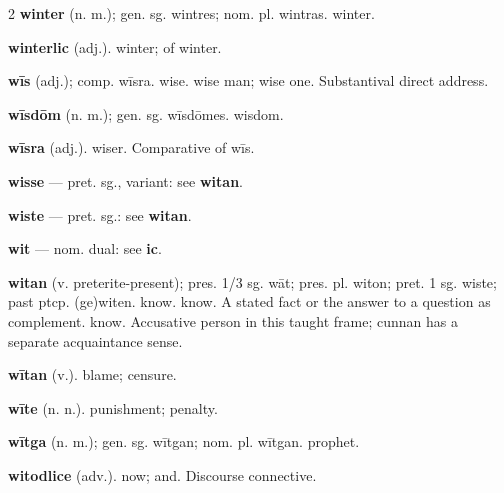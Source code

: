 \begin{multicols*}{2}
\textbf{winter} (n. m.); gen. sg. wintres; nom. pl. wintras. winter.\par
\textbf{winterlic} (adj.). winter; of winter.\par
\textbf{wīs} (adj.); comp. wīsra. wise. wise man; wise one. Substantival direct address.\par
\textbf{wīsdōm} (n. m.); gen. sg. wīsdōmes. wisdom.\par
\textbf{wīsra} (adj.). wiser. Comparative of wīs.\par
\textbf{wisse} — pret. sg., variant: see \textbf{witan}.\par
\textbf{wiste} — pret. sg.: see \textbf{witan}.\par
\textbf{wit} — nom. dual: see \textbf{ic}.\par
\textbf{witan} (v. preterite-present); pres. 1/3 sg. wāt; pres. pl. witon; pret. 1 sg. wiste; past ptcp. (ge)witen. know. know. A stated fact or the answer to a question as complement. know. Accusative person in this taught frame; cunnan has a separate acquaintance sense.\par
\textbf{wītan} (v.). blame; censure.\par
\textbf{wīte} (n. n.). punishment; penalty.\par
\textbf{wītga} (n. m.); gen. sg. wītgan; nom. pl. wītgan. prophet.\par
\textbf{witodlice} (adv.). now; and. Discourse connective.\par

\end{multicols*}
